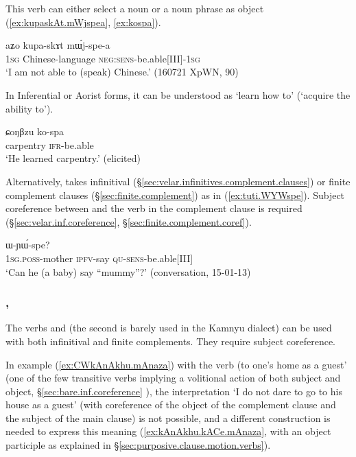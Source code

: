 This verb can either select a noun or a noun phrase as object (\ref{ex:kupaskAt.mWjspea}, \ref{ex:kospa}). 


\begin{exe}
\ex \label{ex:kupaskAt.mWjspea}
\gll aʑo kupa-skɤt mɯ́j-spe-a \\
\textsc{1sg} Chinese-language \textsc{neg}:\textsc{sens}-be.able[III]-\textsc{1sg} \\
\glt `I am not able to (speak) Chinese.' (160721 XpWN, 90)
\end{exe}

In Inferential or Aorist forms, it can be understood as `learn how to' (`acquire the ability to').

\begin{exe}
\ex \label{ex:kospa}
\gll ɕoŋβzu ko-spa \\
carpentry \textsc{ifr}-be.able \\
\glt `He learned carpentry.' (elicited)
\end{exe}

Alternatively,  takes infinitival (§\ref{sec:velar.infinitives.complement.clauses}) or finite complement clauses (§\ref{sec:finite.complement}) as in (\ref{ex:tuti.WYWspe}). Subject coreference between  and the verb in the complement clause is required  (§\ref{sec:velar.inf.coreference},  §\ref{sec:finite.complement.coref}).

\begin{exe}
\ex \label{ex:tuti.WYWspe}
 \gll [``a-mu" tu-ti] ɯ-ɲɯ́-spe? \\
 \textsc{1sg}.\textsc{poss}-mother \textsc{ipfv}-say \textsc{qu}-\textsc{sens}-be.able[III] \\
 \glt `Can he (a baby) say ``mummy''?' (conversation, 15-01-13)
  \end{exe}
  
 \subsubsection{, }  \label{sec:nAz.verb}
 The verbs  and  (the second is barely used in the Kamnyu dialect) can be used with both infinitival and finite complements. They require subject coreference. 
 
 
In example (\ref{ex:CWkAnAkhu.mAnaza})  with the verb  (to one's home as a guest' (one of the few transitive verbs implying a volitional action of both subject and object, §\ref{sec:bare.inf.coreference} ), the interpretation `I do not dare to go to his house as a guest' (with coreference of the object of the complement clause and the subject of the main clause) is not possible, and a different construction is needed to express this meaning (\ref{ex:kAnAkhu.kACe.mAnaza}, with an object participle as explained in §\ref{sec:purposive.clause.motion.verbs}).

